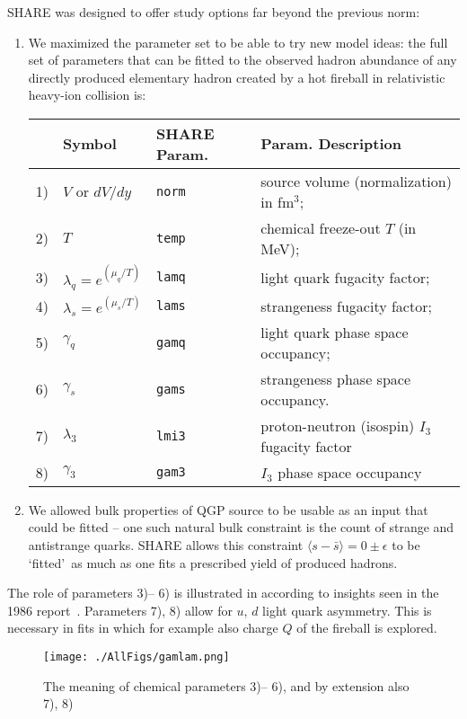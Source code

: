 SHARE was designed to offer study options far beyond the previous norm:
\begin{enumerate}
\item We maximized the parameter set to be able to try new model ideas:
the full set of parameters that can be fitted to the observed hadron abundance of any directly produced elementary hadron created by a hot fireball in relativistic heavy-ion collision is:\\[0.3cm]
\begin{tabular}{p{2ex}p{13ex}p{7ex}p{44ex}}
&Symbol & SHARE Param. & Param. Description\\
\hline
1)& $V$ or $dV/dy$ & \texttt{norm} & source volume (normalization) in fm$^3$;\\
2)& $T$ & \texttt{temp} & chemical freeze-out $T$ (in MeV); \\
3)& $\lambda_q=e^{(\mu_q/T)}$ & \texttt{lamq}& light quark fugacity factor;\\
4)& $\lambda_s=e^{(\mu_s/T)}$ & \texttt{lams}& strangeness fugacity factor;\\
5)& $\gamma_q$ & \texttt{gamq }& light quark phase space occupancy;\\
6)& $\gamma_s$ & \texttt{gams} & strangeness phase space occupancy.\\
7)& $\lambda_3$ &\texttt{lmi3} & proton-neutron (isospin) $I_3$ fugacity factor\\
8)& $\gamma_3$ & \texttt{gam3} & $I_3$ phase space occupancy\\[0.3cm]
\end{tabular}
\item We allowed bulk properties of QGP source to be usable as an input that could be fitted -- one such natural bulk constraint is the count of strange and antistrange quarks. SHARE allows this constraint $\langle s-\bar s\rangle =0\pm \epsilon$ to be \lq fitted\rq\ as much as one fits a prescribed yield of produced hadrons. 
\end{enumerate}
The role of parameters 3)-- 6) is illustrated in  according to insights seen in the 1986 report~\cite{Koch:2017pda}. Parameters 7), 8) allow for $u$, $d$ light quark asymmetry. This is necessary in fits in which for example also charge $Q$ of the fireball is explored.

\begin{figure}[bt]\sidecaption
\texttt{[image: ./AllFigs/gamlam.png]}
\caption{The meaning of chemical parameters 3)-- 6), and by extension also 7), 8)}
\label{gamlam}
\end{figure}

